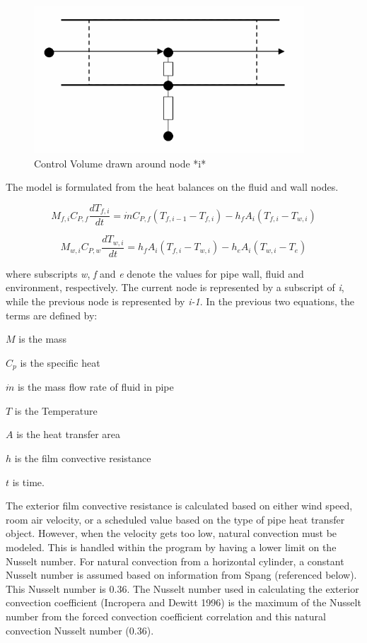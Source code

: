 \begin{figure}[hbtp] %
\centering
\includegraphics[width=0.9\textwidth, height=0.9\textheight, keepaspectratio=true]{media/image5831.png}
\caption{Control Volume drawn around node *i* \protect \label{fig:control-volume-drawn-around-node-i}}
\end{figure}

The model is formulated from the heat balances on the fluid and wall nodes.

\begin{equation}
{M_{f,i}}{C_{P,f}}\frac{{d{T_{f,i}}}}{{dt}} = \dot m{C_{P,f}}\left( {{T_{f,i - 1}} - {T_{f,i}}} \right) - {h_f}{A_i}\left( {{T_{f,i}} - {T_{w,i}}} \right)
\end{equation}

\begin{equation}
{M_{w,i}}{C_{P,w}}\frac{{d{T_{w,i}}}}{{dt}} = {h_f}{A_i}\left( {{T_{f,i}} - {T_{w,i}}} \right) - {h_e}{A_i}\left( {{T_{w,i}} - {T_e}} \right)
\end{equation}

where subscripts \emph{w}, \emph{f} and \emph{e} denote the values for pipe wall, fluid and environment, respectively. The current node is represented by a subscript of \emph{i}, while the previous node is represented by \emph{i-1}.  In the previous two equations, the terms are defined by:

\(M\) is the mass

\({C_p}\) is the specific heat

\(\dot m\) is the mass flow rate of fluid in pipe

\(T\) is the Temperature

\(A\) is the heat transfer area

\(h\) is the film convective resistance

\(t\) is time.

The exterior film convective resistance is calculated based on either wind speed, room air velocity, or a scheduled value based on the type of pipe heat transfer object. However, when the velocity gets too low, natural convection must be modeled. This is handled within the program by having a lower limit on the Nusselt number. For natural convection from a horizontal cylinder, a constant Nusselt number is assumed based on information from Spang (referenced below). This Nusselt number is 0.36. The Nusselt number used in calculating the exterior convection coefficient (Incropera and Dewitt 1996) is the maximum of the Nusselt number from the forced convection coefficient correlation and this natural convection Nusselt number (0.36).

